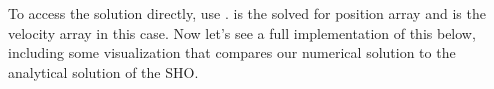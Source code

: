 \documentclass[letterpaper,10pt,english]{jupyterBook}
\begin{document}
\begin{sphinxVerbatim}[commandchars=\\\{\}]
       
\end{sphinxVerbatim}

\sphinxAtStartPar
To access the solution directly, use .  is the solved for position array and  is the velocity array in this case. Now let’s see a full implementation of this below, including some visualization that compares our numerical solution to the analytical solution of the SHO.
\end{document}
